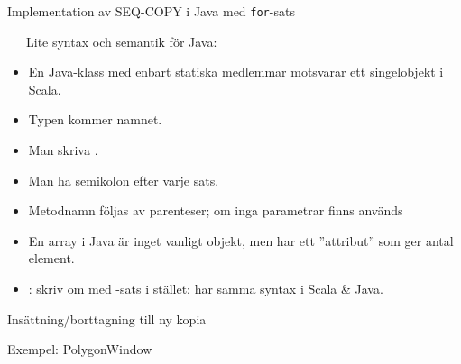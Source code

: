 \begin{Slide}{Implementation av SEQ-COPY i Java med \texttt{for}-sats}
\begin{minipage}{0.55\textwidth}
\vspace{-0.5em}
\end{minipage}
\begin{minipage}{0.44\textwidth}\SlideFontTiny\vspace{-1.5em}
~~~Lite syntax och semantik för Java:
\begin{itemize}
\item En Java-klass med enbart statiska medlemmar motsvarar ett singelobjekt i Scala. 

\item Typen kommer  namnet.

\item Man  skriva .

\item Man  ha semikolon efter varje sats.

\item Metodnamn  följas av parenteser; om inga parametrar finns används \code{()}

\item En array i Java är inget vanligt objekt, men har ett ''attribut''  som ger antal element.

\item {}: skriv om med -sats i stället; har samma syntax i Scala \& Java.

\end{itemize}
\end{minipage}

\end{Slide}


\begin{Slide}{Insättning/borttagning till ny kopia}
\vspace{-0.6em}
\end{Slide}

\begin{Slide}{Exempel: PolygonWindow}
\vspace{-0.6em}
\pause
\vspace{1em}
\end{Slide}

